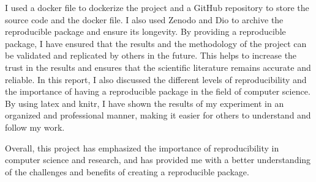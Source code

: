 \documentclass[manuscript,screen,review]{acmart}
\begin{document}
I used a docker file to dockerize the project and a GitHub repository to store the source code and the docker file. I also used Zenodo and Dio to archive the reproducible package and ensure its longevity.
By providing a reproducible package, I have ensured that the results and the methodology of the project can be validated and replicated by others in the future. This helps to increase the trust in the results and ensures that the scientific literature remains accurate and reliable.
In this report, I also discussed the different levels of reproducibility and the importance of having a reproducible package in the field of computer science. By using latex and knitr, I have shown the results of my experiment in an organized and professional manner, making it easier for others to understand and follow my work.

Overall, this project has emphasized the importance of reproducibility in computer science and research, and has provided me with a better understanding of the challenges and benefits of creating a reproducible package.
\end{document}
